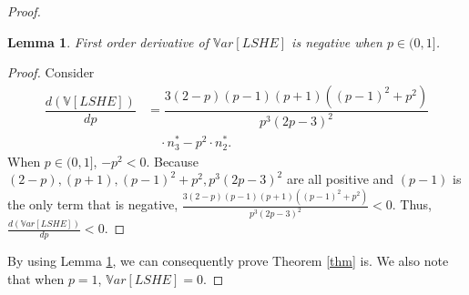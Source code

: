 \documentclass[aoas]{imsart}
\newtheorem{lemma}{Lemma}
\begin{document}
\begin{proof}
	\begin{lemma}
		\label{lemma}
		First order derivative of $\mathbb{V}ar[LSHE]$ is negative when $p \in (0,1]$.
	\end{lemma}
	\begin{proof}
	Consider
	\begin{align*}
	\dfrac{d(\mathbb{V}[LSHE])}{dp} &= \dfrac{3(2-p)(p-1)(p+1)((p-1)^2+p^2)}{p^3(2p-3)^2} \\ &\quad \cdot n_3^*
	-p^2 \cdot n_2^*.
	\end{align*}
	When $p\in(0,1]$,  $-p^2 <0$. Because $(2-p), (p+1), (p-1)^2+p^2,p^3(2p-3)^2$ are all positive and $(p-1)$ is the only term that is negative, $\frac{3(2-p)(p-1)(p+1)((p-1)^2+p^2)}{p^3(2p-3)^2} < 0$. Thus, $\frac{d(\mathbb{V}ar[LSHE])}{dp} < 0$.
\end{proof}
	By using Lemma \ref{lemma}, we can consequently prove Theorem \ref{thm} is. We also note that when $p=1$, $\mathbb{V}ar[LSHE] = 0$.
\end{proof}
%
%
\end{document}
